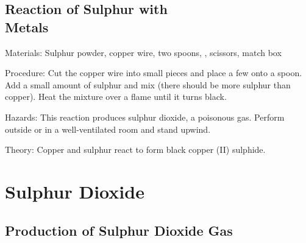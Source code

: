\begin{multicols}{2}
\subsection{Reaction of Sulphur with \hfill \\ Metals} %


\begin{description*}
\item[Materials:]{Sulphur powder, copper wire, two spoons, , scissors, match box}
\item[Procedure:]{Cut the copper wire into small pieces and place a few onto a spoon. Add a small amount of sulphur and mix (there should be more sulphur than copper). Heat the mixture over a flame until it turns black.}
\item[Hazards:]{This reaction produces sulphur dioxide, a poisonous gas. Perform outside or in a well-ventilated room and stand upwind.}
\item[Theory:]{Copper and sulphur react to form black copper (II) sulphide.}
\end{description*}

\columnbreak


\section*{Sulphur Dioxide}


\subsection{Production of Sulphur Dioxide Gas} %


\end{multicols}
